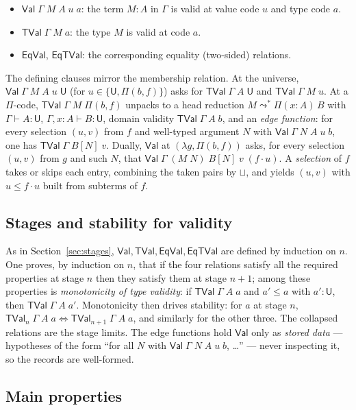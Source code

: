 \documentclass[11pt]{article}
\newcommand{\hastype}[3]{#1 \vdash #2 : #3}
\newcommand{\Pitype}[2]{\Pi(#1)\,#2}
\newcommand{\App}[2]{#1\;#2}
\newcommand{\substone}[2]{#1[#2]}
\newcommand{\U}{\mathsf{U}}
\newcommand{\Red}{\mathrel{\leadsto^{*}}}
\newcommand{\PiC}[2]{\Pi(#1,#2)}        %
\newcommand{\FunEl}[1]{\lambda #1}      %
\newcommand{\ev}[2]{#1\!\cdot\!#2}      %
\newcommand{\Val}{\mathsf{Val}}
\newcommand{\TVal}{\mathsf{TVal}}
\newcommand{\EqVal}{\mathsf{EqVal}}
\newcommand{\EqTVal}{\mathsf{EqTVal}}
\theoremstyle{plain}
\theoremstyle{definition}
\begin{document}
\begin{itemize}
  \item $\Val\;\Gamma\;M\;A\;u\;a$: the term $M:A$ in $\Gamma$ is valid at value
    code $u$ and type code $a$.
  \item $\TVal\;\Gamma\;M\;a$: the type $M$ is valid at code $a$.
  \item $\EqVal$, $\EqTVal$: the corresponding equality (two-sided) relations.
\end{itemize}
The defining clauses mirror the membership relation.  At the universe,
$\Val\;\Gamma\;M\;A\;u\;\U$ (for $u\in\{\U,\PiC{b}{f}\}$) asks for
$\TVal\;\Gamma\;A\;\U$ and $\TVal\;\Gamma\;M\;u$.  At a $\Pi$-code,
$\TVal\;\Gamma\;M\;\PiC{b}{f}$ unpacks to a head reduction
$M \Red \Pitype{x{:}A}{B}$ with $\hastype{\Gamma}{A}{\U}$,
$\hastype{\Gamma,x{:}A}{B}{\U}$, domain validity $\TVal\;\Gamma\;A\;b$, and an
\emph{edge function}: for every selection $(u,v)$ from $f$ and well-typed
argument $N$ with $\Val\;\Gamma\;N\;A\;u\;b$, one has
$\TVal\;\Gamma\;\substone{B}{N}\;v$.  Dually, $\Val$ at $(\FunEl g,\PiC{b}{f})$
asks, for every selection $(u,v)$ from $g$ and such $N$, that
$\Val\;\Gamma\;(\App M N)\;\substone{B}{N}\;v\;(\ev f u)$.  A \emph{selection}
of $f$ takes or skips each entry, combining the taken pairs by $\sqcup$, and
yields $(u,v)$ with $u \leq \ev f u$ built from subterms of $f$.

\subsection{Stages and stability for validity}

As in Section~\ref{sec:stages}, $\Val,\TVal,\EqVal,\EqTVal$ are defined by
induction on $n$.  One proves, by induction on $n$, that if the four relations
satisfy all the required properties at stage $n$ then they satisfy them at
stage $n{+}1$; among these properties is \emph{monotonicity of type validity}:
if $\TVal\;\Gamma\;A\;a$ and $a' \leq a$ with $a' : \U$, then
$\TVal\;\Gamma\;A\;a'$.  Monotonicity then drives stability: for $a$ at stage
$n$, $\TVal_n\;\Gamma\;A\;a \iff \TVal_{n+1}\;\Gamma\;A\;a$, and similarly for
the other three.  The collapsed relations are the stage limits.  The edge
functions hold $\Val$ only as \emph{stored data} --- hypotheses of the form
``for all $N$ with $\Val\;\Gamma\;N\;A\;u\;b$, \ldots'' --- never inspecting it,
so the records are well-formed.

\subsection{Main properties}
\end{document}
